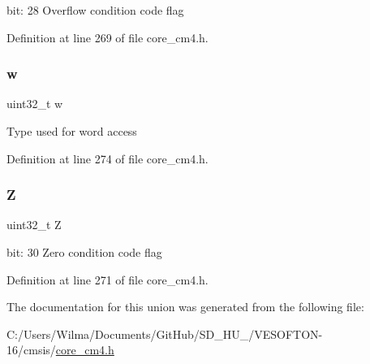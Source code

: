 bit\+: 28 Overflow condition code flag 

Definition at line 269 of file core\+\_\+cm4.\+h.

\mbox{\label{unionx_p_s_r___type_ad0fb62e7a08e70fc5e0a76b67809f84b}} 
\subsubsection{\texorpdfstring{w}{w}}
{\footnotesize\ttfamily uint32\+\_\+t w}

Type used for word access 

Definition at line 274 of file core\+\_\+cm4.\+h.

\mbox{\label{unionx_p_s_r___type_a5ae954cbd9986cd64625d7fa00943c8e}} 
\subsubsection{\texorpdfstring{Z}{Z}}
{\footnotesize\ttfamily uint32\+\_\+t Z}

bit\+: 30 Zero condition code flag 

Definition at line 271 of file core\+\_\+cm4.\+h.



The documentation for this union was generated from the following file\+:\begin{DoxyCompactItemize}
\item 
C\+:/\+Users/\+Wilma/\+Documents/\+Git\+Hub/\+S\+D\+\_\+\+H\+U\+\_/\+V\+E\+S\+O\+F\+T\+O\+N-\/16/cmsis/\hyperlink{core__cm4_8h}{core\+\_\+cm4.\+h}\end{DoxyCompactItemize}
